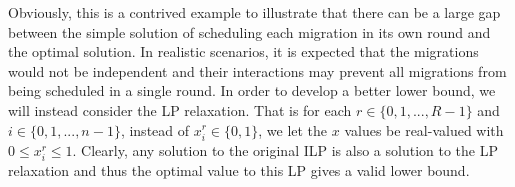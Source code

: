 \documentclass[letterpaper,12pt,titlepage,oneside,final]{article}
\begin{document}
Obviously, this is a contrived example to illustrate that there can be a large gap between the simple solution of scheduling each migration in its own round and the optimal solution. In realistic scenarios, it is expected that the migrations would not be independent and their interactions may prevent all migrations from being scheduled in a single round. In order to develop a better lower bound, we will instead consider the LP relaxation. That is for each $r \in \{0, 1, ..., R - 1\}$ and $i \in \{0, 1, ..., n - 1\}$, instead of $x^{r}_{i} \in \{0, 1\}$, we let the $x$ values be real-valued with $0 \leq x^{r}_{i} \leq 1$. Clearly, any solution to the original ILP is also a solution to the LP relaxation and thus the optimal value to this LP gives a valid lower bound.
 
\newpage



\end{document}
